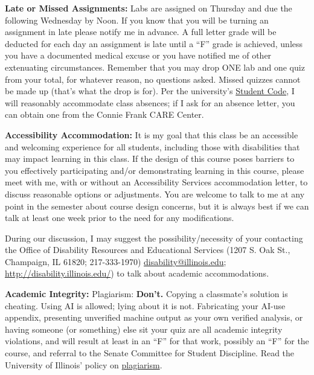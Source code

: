 {\bf \headerfont \color{RoyalBlue} Late or Missed Assignments:}
Labs are assigned on Thursday and due the following Wednesday by Noon. If you
know that you will be turning an assignment in late please notify me in
advance. A full letter grade will be deducted for each day an assignment is
late until a ``{\color{Red}F}'' grade is achieved, unless you have a documented
medical excuse or you have notified me of other extenuating circumstances.
Remember that you may drop ONE lab and one quiz from your total, for whatever
reason, no questions asked. Missed quizzes cannot be made up (that's what the
drop is for).
Per the university's \href{https://studentcode.illinois.edu/}{Student Code}, I
will reasonably accommodate class absences; if I ask for an absence letter,
you can obtain one from the Connie Frank CARE Center.
\medskip

{\bf \headerfont \color{RoyalBlue} Accessibility Accommodation:}
It is my goal that this class be an accessible and welcoming experience for all
students, including those with disabilities that may impact learning in this
class. If the design of this course poses barriers to you effectively
participating and/or demonstrating learning in this course, please meet with
me, with or without an Accessibility Services accommodation letter, to discuss
reasonable options or adjustments. You are welcome to talk to me at any point
in the semester about course design concerns, but it is always best if we can
talk at least one week prior to the need for any modifications.

During our discussion, I may suggest the possibility/necessity of your
contacting the Office of Disability Resources and Educational Services (1207 S.
Oak St., Champaign, IL 61820; 217-333-1970)
\href{mailto:disability@illinois.edu}{disability@illinois.edu};
\url{http://disability.illinois.edu/}) to talk about academic accommodations.
\medskip

{\bf \headerfont \color{RoyalBlue} Academic Integrity:}
Plagiarism: {\bf \color{Red} Don't.} Copying a
classmate's solution is cheating. Using AI is allowed; lying about
it is not. Fabricating your AI-use appendix, presenting unverified machine output as
your own verified analysis, or having someone (or something) else sit your
quiz are all academic integrity violations, and will result at
least in an ``{\color{Red}F}'' for that work, possibly an ``{\color{Red}F}''
for the course, and referral to the Senate Committee for Student Discipline.
Read the University of Illinois' policy on
\href{https://studentcode.illinois.edu/article1/part4/1-402/}{plagiarism}.

